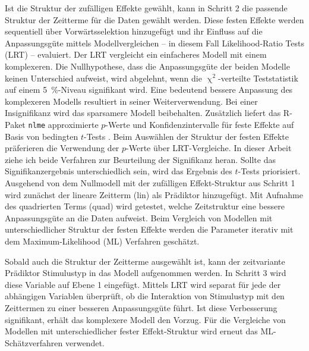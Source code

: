 	
		Ist die Struktur der zufälligen Effekte gewählt, kann in Schritt 2 die passende Struktur der Zeitterme für die Daten gewählt werden. 
		Diese festen Effekte werden sequentiell über Vorwärtsselektion hinzugefügt und ihr Einfluss auf die Anpassungsgüte mittels Modellvergleichen -- in diesem Fall Likelihood-Ratio Tests (LRT) -- evaluiert. Der LRT vergleicht ein einfacheres Modell %
		mit einem komplexeren. Die Nullhypothese, dass die Anpassungsgüte der beiden Modelle keinen Unterschied aufweist, wird abgelehnt, wenn die $\upchi^2$-verteilte Teststatistik
		auf einem \SI{5}{\percent}-Niveau signifikant wird. Eine bedeutend bessere Anpassung des komplexeren Modells resultiert in seiner Weiterverwendung. Bei einer Insignifikanz wird das sparsamere Modell beibehalten.	
		Zusätzlich liefert das R-Paket \texttt{nlme} approximierte $p$-Werte und Konfidenzintervalle für feste Effekte auf Basis von bedingten $t$-Tests \parencite{PINHEIRO2000}. Beim Auswählen der Struktur der festen Effekte präferieren \textcite{PINHEIRO2000} die Verwendung der $p$-Werte über LRT-Vergleiche. In dieser Arbeit ziehe ich beide Verfahren zur Beurteilung der Signifikanz heran. Sollte das Signifikanzergebnis unterschiedlich sein, wird das Ergebnis des $t$-Tests priorisiert.
		Ausgehend von dem Nullmodell mit der zufälligen Effekt-Struktur aus Schritt 1 wird zunächst der lineare Zeitterm (lin) als Prädiktor hinzugefügt. Mit Aufnahme des quadrierten Terms (quad) wird getestet, welche Zeitstruktur eine bessere Anpassungsgüte an die Daten aufweist. Beim Vergleich von Modellen mit unterschiedlicher Struktur der festen Effekte werden die Parameter iterativ mit dem Maximum-Likelihood (ML) Verfahren geschätzt. 
		
		Sobald auch die Struktur der Zeitterme ausgewählt ist, kann der zeitvariante Prädiktor Stimulustyp in das Modell aufgenommen werden. In Schritt 3 wird diese Variable auf Ebene 1 eingefügt. Mittels LRT wird separat für jede der abhängigen Variablen überprüft, ob die Interaktion von Stimulustyp mit den Zeittermen zu einer besseren Anpassungsgüte führt. Ist diese Verbesserung signifikant, erhält das komplexere Modell den Vorzug. Für die Vergleiche von Modellen mit unterschiedlicher fester Effekt-Struktur wird erneut das ML-Schätzverfahren verwendet.
		

